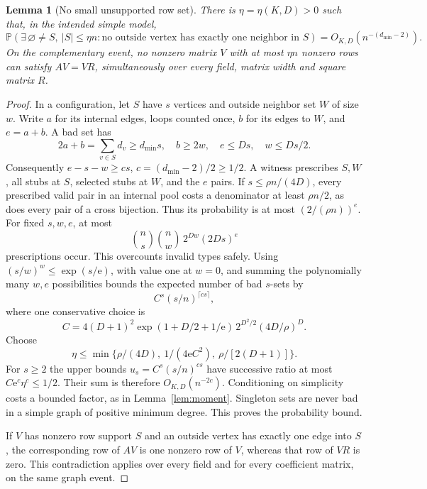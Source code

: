 \documentclass[11pt]{article}
\newtheorem{lemma}{Lemma}
\newcommand{\Prob}{\mathbb P}
\begin{document}
\begin{lemma}[No small unsupported row set]\label{lem:support}
There is $\eta=\eta(K,D)>0$ such that, in the intended simple model,
\[
 \Prob(\exists\,\varnothing\ne S,\ |S|\le\eta n:
       \text{no outside vertex has exactly one neighbor in }S)
       =O_{K,D}(n^{-(d_{\min}-2)}).
\]
On the complementary event, no nonzero matrix $V$ with at most $\eta n$
nonzero rows can satisfy $AV=VR$, simultaneously over every field,
matrix width and square matrix $R$.
\end{lemma}
\begin{proof}
In a configuration, let $S$ have $s$ vertices and outside neighbor set
$W$ of size $w$. Write $a$ for its internal edges, loops counted once,
$b$ for its edges to $W$, and $e=a+b$. A bad set has
\[
 2a+b=\sum_{v\in S}d_v\ge d_{\min}s,\quad b\ge2w,
 \quad e\le Ds,\quad w\le Ds/2.
\]
Consequently $e-s-w\ge cs$, $c=(d_{\min}-2)/2\ge1/2$.
A witness prescribes $S,W$, all stubs at $S$, selected stubs at $W$,
and the $e$ pairs. If $s\le\rho n/(4D)$, every prescribed valid pair
in an internal pool costs a denominator at least $\rho n/2$, as does
every pair of a cross bijection. Thus its probability is at most
$(2/(\rho n))^e$. For fixed $s,w,e$, at most
\[
 \binom ns\binom nw\,2^{Dw}(2Ds)^e
\]
prescriptions occur. This overcounts invalid types safely. Using
$(s/w)^w\le \exp(s/\mathrm e)$, with value one at $w=0$, and summing the
polynomially many $w,e$ possibilities bounds the expected number of
bad $s$-sets by
\[
 C^s(s/n)^{\lceil cs\rceil},
\]
where one conservative choice is
\[
 C=4(D+1)^2\exp(1+D/2+1/\mathrm e)\,2^{D^2/2}(4D/\rho)^D.
\]
Choose
\[
 \eta\le\min\{\rho/(4D),\ 1/(4\mathrm e C^2),\ \rho/[2(D+1)]\}.
\]
For $s\ge2$ the upper bounds $u_s=C^s(s/n)^{cs}$ have successive
ratio at most $C\mathrm e^c\eta^c\le1/2$. Their sum is therefore
$O_{K,D}(n^{-2c})$. Conditioning on simplicity costs a bounded factor,
as in Lemma~\ref{lem:moment}. Singleton sets are never bad in a simple
graph of positive minimum degree. This proves the probability bound.

If $V$ has nonzero row support $S$ and an outside vertex has exactly one
edge into $S$, the corresponding row of $AV$ is one nonzero row of $V$,
whereas that row of $VR$ is zero. This contradiction applies over every
field and for every coefficient matrix, on the same graph event.
\end{proof}
\end{document}
